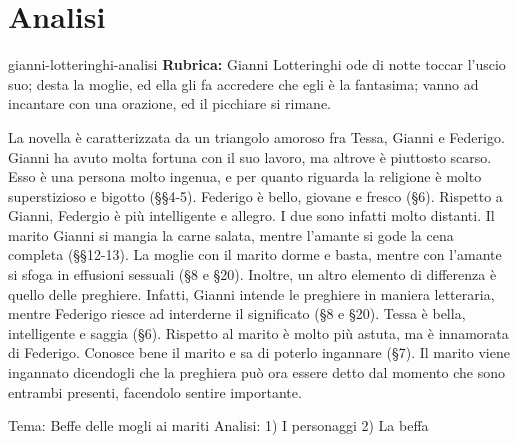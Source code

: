 \documentclass[preview]{standalone}
\begin{document}
\genpage

\section{Analisi}

\begin{snippet}{gianni-lotteringhi-analisi}
    \textbf{Rubrica:} Gianni Lotteringhi ode di notte toccar l'uscio suo; desta la moglie, ed ella gli fa accredere che egli è la fantasima; vanno ad incantare con una orazione, ed il picchiare si rimane.

    
    La novella è caratterizzata da un triangolo amoroso fra Tessa, Gianni e Federigo.
    Gianni ha avuto molta fortuna con il suo lavoro, ma altrove è piuttosto scarso.
    Esso è una persona molto ingenua, e per quanto riguarda la religione è molto
    superstizioso e bigotto (§§4-5).
    Federigo è bello, giovane e fresco (§6).
    Rispetto a Gianni, Federgio è più intelligente e allegro.
    I due sono infatti molto distanti.
    Il marito Gianni si mangia la carne salata, mentre l'amante si gode la cena completa (§§12-13).
    La moglie con il marito dorme e basta, mentre con l'amante si sfoga in effusioni sessuali (§8 e §20).
    Inoltre, un altro elemento di differenza è quello delle preghiere. Infatti, Gianni intende le preghiere in maniera letteraria,
    mentre Federigo riesce ad interderne il significato (§8 e §20).
    Tessa è bella, intelligente e saggia (§6). Rispetto al marito è molto più astuta, ma è innamorata di Federigo.
    Conosce bene il marito e sa di poterlo ingannare (§7).
    Il marito viene ingannato dicendogli che la preghiera può ora essere detto dal momento che sono
    entrambi presenti, facendolo sentire importante.
    
    
\end{snippet}


Tema: Beffe delle mogli ai mariti 
Analisi: 
	1) I personaggi
	2) La beffa
\end{document}
